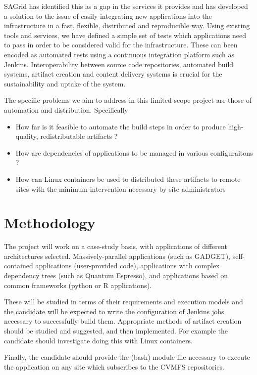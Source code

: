 \documentclass[oneside, a4paper, onecolumn, 11pt]{article}
\begin{document}
SAGrid has identified this as a gap in the services it provides and has developed a solution to the issue of easily integrating new applications into the infrastructure in a fast, flexible, distributed and reproducible way. Using existing tools and services, we have defined a simple set of tests which applications need to pass in order to be considered valid for the infrastructure. These can been encoded as automated tests using a continuous integration platform such as Jenkins. Interoperability between source code repositories, automated build systems, artifact creation and content delivery systems is crucial for the sustainability and uptake of the system.

The specific problems we aim to address in this limited-scope project are those of automation and distribution. Specifically

\begin{itemize}
\item How far is it feasible to automate the build steps in order to produce high-quality, redistributable artifacts ?
\item How are dependencies of applications to be managed in various configuraitons ?
\item How can Linux containers be used to distributed these artifacts to remote sites with the minimum intervention necessary by site administrators
\end{itemize}

\section{Methodology}

The project will work on a case-study basis, with applications of different architectures selected. Massively-parallel applications (such as GADGET), self-contained applications (user-provided code), applications with complex dependency trees (such as Quantum Espresso), and applications based on common frameworks (python or R applications).

These will be studied in terms of their requirements and execution models and the candidate will be expected to write the configuration of Jenkins jobs necessary to successfully build them. Appropriate methods of artifact creation should be studied and suggested, and then implemented. For example the candidate should investigate doing this with Linux containers.

Finally, the candidate should provide the (bash) module file necessary to execute the application on any site which subscribes to the CVMFS repositories.
\end{document}

